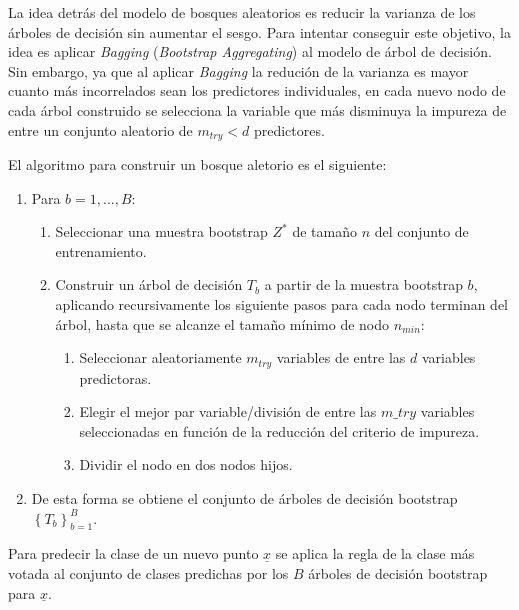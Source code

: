 \documentclass[12pt,a4paper,]{book}
\providecommand{\tightlist}{%
  \setlength{\itemsep}{0pt}\setlength{\parskip}{0pt}}
\numberwithin{dummy}{section}
\theoremstyle{ocrenumbox}
\theoremstyle{blacknumex}
\theoremstyle{blacknumbox}
\theoremstyle{ocrenum}
\theoremstyle{ocrenum}
\begin{document}
La idea detrás del modelo de bosques aleatorios es reducir la varianza
de los árboles de decisión sin aumentar el sesgo. Para intentar
conseguir este objetivo, la idea es aplicar \emph{Bagging}
(\emph{Bootstrap Aggregating}) al modelo de árbol de decisión. Sin
embargo, ya que al aplicar \emph{Bagging} la redución de la varianza es
mayor cuanto más incorrelados sean los predictores individuales, en cada
nuevo nodo de cada árbol construido se selecciona la variable que más
disminuya la impureza de entre un conjunto aleatorio de \(m_{try} < d\)
predictores.

El algoritmo para construir un bosque aletorio es el siguiente:

\begin{enumerate}
\def\labelenumi{\arabic{enumi}.}
\item
  Para \(b = {1,...,B}:\)

  \begin{enumerate}
  \def\labelenumii{\alph{enumii})}
  \item
    Seleccionar una muestra bootstrap \(Z^*\) de tamaño \(n\) del
    conjunto de entrenamiento.
  \item
    Construir un árbol de decisión \(T_b\) a partir de la muestra
    bootstrap \(b\), aplicando recursivamente los siguiente pasos para
    cada nodo terminan del árbol, hasta que se alcanze el tamaño mínimo
    de nodo \(n_{min}:\)

    \begin{enumerate}
    \def\labelenumiii{\roman{enumiii}.}
    \tightlist
    \item
      Seleccionar aleatoriamente \(m_{try}\) variables de entre las
      \(d\) variables predictoras.
    \item
      Elegir el mejor par variable/división de entre las \(m\_try\)
      variables seleccionadas en función de la reducción del criterio de
      impureza.
    \item
      Dividir el nodo en dos nodos hijos.
    \end{enumerate}
  \end{enumerate}
\item
  De esta forma se obtiene el conjunto de árboles de decisión bootstrap
  \(\left\{ T_b \right\}_{b=1}^B\).
\end{enumerate}

Para predecir la clase de un nuevo punto \(\underline x\) se aplica la
regla de la clase más votada al conjunto de clases predichas por los
\(B\) árboles de decisión bootstrap para \(\underline x\).
\end{document}
